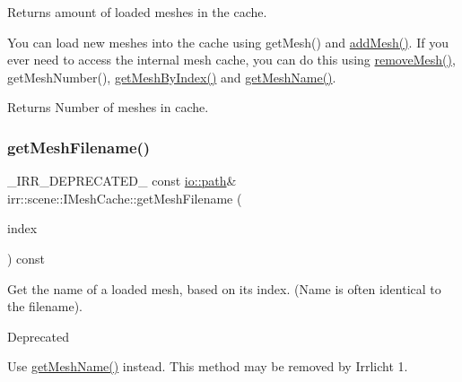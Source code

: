 Returns amount of loaded meshes in the cache. 

You can load new meshes into the cache using get\+Mesh() and \hyperlink{classirr_1_1scene_1_1IMeshCache_a2959812a3a393817b1db42761766c49b}{add\+Mesh()}. If you ever need to access the internal mesh cache, you can do this using \hyperlink{classirr_1_1scene_1_1IMeshCache_aa82078b06fdcaa332b44a59e4027f921}{remove\+Mesh()}, get\+Mesh\+Number(), \hyperlink{classirr_1_1scene_1_1IMeshCache_a06e7755013445f9bc3d7339fbd009e31}{get\+Mesh\+By\+Index()} and \hyperlink{classirr_1_1scene_1_1IMeshCache_af06efb8fb21f6bba16e52d879b5d3ddd}{get\+Mesh\+Name()}. \begin{DoxyReturn}{Returns}
Number of meshes in cache. 
\end{DoxyReturn}
\mbox{\label{classirr_1_1scene_1_1IMeshCache_afda96c4fb8ab272f3d3688dcaef3abc3}} 
\subsubsection{\texorpdfstring{get\+Mesh\+Filename()}{getMeshFilename()}\hspace{0.1cm}{\footnotesize\ttfamily [1/4]}}
{\footnotesize\ttfamily \+\_\+\+I\+R\+R\+\_\+\+D\+E\+P\+R\+E\+C\+A\+T\+E\+D\+\_\+ const \hyperlink{namespaceirr_1_1io_a6468281622ce3a1c46b72e19f32dded5}{io\+::path}\& irr\+::scene\+::\+I\+Mesh\+Cache\+::get\+Mesh\+Filename (\begin{DoxyParamCaption}\item[{\hyperlink{namespaceirr_a0416a53257075833e7002efd0a18e804}{u32}}]{index }\end{DoxyParamCaption}) const\hspace{0.3cm}{\ttfamily [inline]}}



Get the name of a loaded mesh, based on its index. (Name is often identical to the filename). 

\begin{DoxyRefDesc}{Deprecated}
\item[\hyperlink{deprecated__deprecated000036}{Deprecated}]Use \hyperlink{classirr_1_1scene_1_1IMeshCache_af06efb8fb21f6bba16e52d879b5d3ddd}{get\+Mesh\+Name()} instead. This method may be removed by Irrlicht 1. \end{DoxyRefDesc}
\mbox{\label{classirr_1_1scene_1_1IMeshCache_afda96c4fb8ab272f3d3688dcaef3abc3}} 
